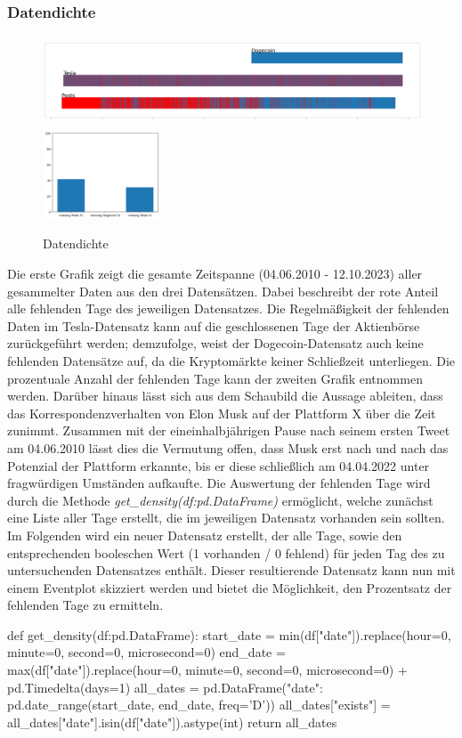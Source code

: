\documentclass{article}
\begin{document}
\subsubsection{Datendichte} \label{Datendichte}
\begin{figure}[!htb]
  	\includegraphics[width=.7\textwidth, height=100px]{../imgs/Dichte1.png}
	\includegraphics[width=.3\textwidth, height=100px]{../imgs/Dichte2.png}
 	\caption{Datendichte}
 	\label{fig:Datendichte}
\end{figure}
Die erste Grafik zeigt die gesamte Zeitspanne (04.06.2010 - 12.10.2023) aller gesammelter Daten aus den drei Datensätzen.
Dabei beschreibt der rote Anteil alle fehlenden Tage des jeweiligen Datensatzes.
Die Regelmäßigkeit der fehlenden Daten im Tesla-Datensatz kann auf die geschlossenen Tage der Aktienbörse zurückgeführt werden;
demzufolge, weist der Dogecoin-Datensatz auch keine fehlenden Datensätze auf, da die Kryptomärkte keiner Schließzeit unterliegen.
Die prozentuale Anzahl der fehlenden Tage kann der zweiten Grafik entnommen werden.
Darüber hinaus lässt sich aus dem Schaubild die Aussage ableiten, dass das Korrespondenzverhalten von Elon Musk auf der Plattform X über die Zeit zunimmt.
Zusammen mit der eineinhalbjährigen Pause nach seinem ersten Tweet am 04.06.2010 lässt dies die Vermutung offen, dass Musk erst nach und nach das Potenzial der Plattform erkannte, bis er diese schließlich am 04.04.2022 unter fragwürdigen Umständen aufkaufte. 
Die Auswertung der fehlenden Tage wird durch die Methode \textit{get\_density(df:pd.DataFrame)} ermöglicht, welche zunächst eine Liste aller Tage erstellt, die im jeweiligen Datensatz vorhanden sein sollten.
Im Folgenden wird ein neuer Datensatz erstellt, der alle Tage, sowie den entsprechenden booleschen Wert (1 vorhanden / 0 fehlend) für jeden Tag des zu untersuchenden Datensatzes enthält.
Dieser resultierende Datensatz kann nun mit einem Eventplot skizziert werden und bietet die Möglichkeit, den Prozentsatz der fehlenden Tage zu ermitteln.
\begin{python}
def get_density(df:pd.DataFrame):
    start_date = min(df["date"]).replace(hour=0, minute=0, second=0, microsecond=0)
    end_date = max(df["date"]).replace(hour=0, minute=0, second=0, microsecond=0) + pd.Timedelta(days=1)
    all_dates = pd.DataFrame({"date": pd.date_range(start_date, end_date, freq='D')})
    all_dates["exists"] = all_dates["date"].isin(df["date"]).astype(int)
    return all_dates
\end{python}
\end{document}
